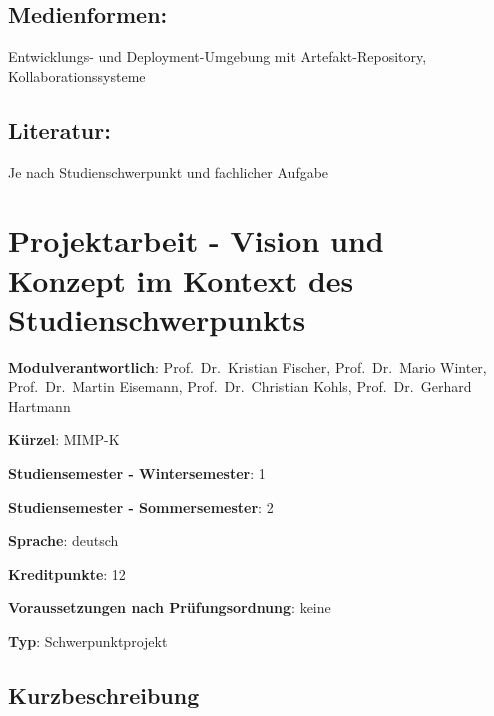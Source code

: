 \section*{Medienformen:}\label{medienformen-9}

Entwicklungs- und Deployment-Umgebung mit Artefakt-Repository,
Kollaborationssysteme

\section*{Literatur:}\label{literatur-9}

Je nach Studienschwerpunkt und fachlicher Aufgabe

\chapter{Projektarbeit - Vision und Konzept im Kontext des
Studienschwerpunkts}\label{projektarbeit---vision-und-konzept-im-kontext-des-studienschwerpunkts}

\begin{modulHead}
\textbf{Modulverantwortlich}: Prof.~Dr.~Kristian
Fischer, Prof.~Dr.~Mario Winter, Prof.~Dr.~Martin Eisemann,
Prof.~Dr.~Christian Kohls, Prof.~Dr.~Gerhard
Hartmann
\end{modulHead}
\begin{modulHead}
\textbf{Kürzel}:
MIMP-K
\end{modulHead}
\begin{modulHead}
\textbf{Studiensemester -
Wintersemester}:
1
\end{modulHead}
\begin{modulHead}
\textbf{Studiensemester -
Sommersemester}: 2
\end{modulHead}
\begin{modulHead}
\textbf{Sprache}:
deutsch
\end{modulHead}
\begin{modulHead}
\textbf{Kreditpunkte}:
12
\end{modulHead}
\begin{modulHead}
\textbf{Voraussetzungen nach
Prüfungsordnung}: keine
\end{modulHead}
\begin{modulHead}
\textbf{Typ}:
Schwerpunktprojekt
\end{modulHead}


\section*{Kurzbeschreibung}\label{kurzbeschreibung-9}

